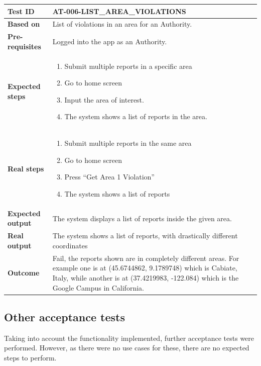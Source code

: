 \begin{table}[H]
    \centering
    \begin{tabular}{p{3cm}p{10cm}}
    \textbf{Test ID} & AT-006-LIST\_AREA\_VIOLATIONS \\ \hline
    \textbf{Based on} & List of violations in an area for an Authority. \\ \hline
    \textbf{Pre-requisites} & Logged into the app as an Authority. \\ \hline
    \textbf{Expected steps} & 
        \begin{enumerate} \itemsep0em
            \item Submit multiple reports in a specific area
            \item Go to home screen
            \item Input the area of interest.
            \item The system shows a list of reports in the area.
        \end{enumerate} \\ \hline
    \textbf{Real steps} & 
        \begin{enumerate} \itemsep0em
            \item Submit multiple reports in the same area
            \item Go to home screen
            \item Press “Get Area 1 Violation”
            \item The system shows a list of reports
        \end{enumerate} \\ \hline
    \textbf{Expected output} & The system displays a list of reports inside the given area. \\ \hline
    \textbf{Real output} & The system shows a list of reports, with drastically different coordinates \\ \hline
    \textbf{Outcome} & Fail, the reports shown are in completely different areas. For example one is at (45.6744862, 9.1789748) which is Cabiate, Italy, while another is at (37.4219983, -122.084) which is the Google Campus in California. \\ \hline
    \end{tabular}
\end{table}

\subsection{Other acceptance tests}
Taking into account the functionality implemented, further acceptance tests were performed. However, as there were no use cases for these, there are no expected steps to perform. \\

